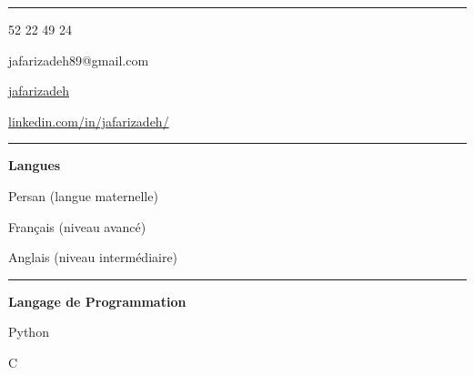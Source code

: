 \documentclass[a4paper]{letter}
\newcommand{\divider}{\rule{\linewidth}{0.9pt}}
\begin{document}
\begin{minipage}[t]{0.30\textwidth}
\setlength{\baselineskip}{1\baselineskip}
\color{white}
\vspace{5mm}




\vspace{5mm}

\divider


\faPhone {} 52 22 49 24

\faEnvelope \quad jafarizadeh89@gmail.com

\faGithub \quad \href{https://github.com/jafarizadeh}{jafarizadeh}

\faLinkedin \quad \href{https://www.linkedin.com/in/jafarizadeh/}{linkedin.com/in/jafarizadeh/}


\divider

{\large \textbf{Langues}}

\faCircleNotch \quad Persan (langue maternelle)

\faCircleNotch \quad Français (niveau avancé)

\faCircleNotch \quad Anglais (niveau intermédiaire)

\divider


{\large \textbf{Langage de Programmation}}

\faCircleNotch \quad Python

\faCircleNotch \quad C


\end{minipage}
\end{document}

